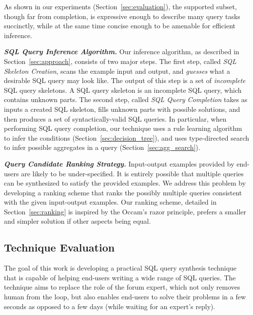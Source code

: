 As shown in our experiments (Section~\ref{sec:evaluation}), the supported subset, though far from completion, is expressive
enough to describe many query tasks succinctly, while at the same time concise
enough to be amenable for efficient inference. 



\vspace{1mm}
\noindent \textbf{\textit{SQL Query Inference Algorithm.}} Our inference
algorithm, as described in Section~\ref{sec:approach}, consists of two
major steps. The first step, called \textit{SQL Skeleton Creation}, scans
the example input and output, and \textit{guesses} what a desirable
SQL query may look like. The output of this step is a set of \textit{incomplete} SQL
query skeletons. A SQL query skeleton is an incomplete SQL query,
which contains unknown parts. The second step,
called \textit{SQL Query Completion} takes as inputs a created
SQL skeleton, fills unknown parts with possible solutions, and then produces a set of
syntactically-valid SQL queries. In particular, when performing
SQL query completion, our technique uses a rule learning algorithm
to infer the conditions (Section~\ref{sec:decision_tree}), and uses 
type-directed search to infer possible aggregates in a query (Section~\ref{sec:agg_search}).

\vspace{1mm}
\noindent \textbf{\textit{Query Candidate Ranking Strategy.}}
Input-output examples provided by end-users are likely to
be under-specified. It is entirely possible that multiple
queries can be synthesized to satisfy the provided examples.
We address this problem by developing a ranking scheme that 
ranks the possibly multiple queries
consistent with the given input-output
examples. Our ranking scheme, detailed in Section~\ref{sec:ranking}
is inspired by the Occam's razor principle, prefers a smaller and
simpler solution if other aspects being equal.




\subsection{Technique Evaluation}

The goal of this work is developing a practical SQL query synthesis technique that is capable of
helping end-users writing a wide range of SQL queries.
The technique aims to replace the role of the forum expert,
which not only removes human from the loop, but also enables
end-users to solve their problems in a few seconds as opposed to a few days
(while waiting for an expert's reply). 

